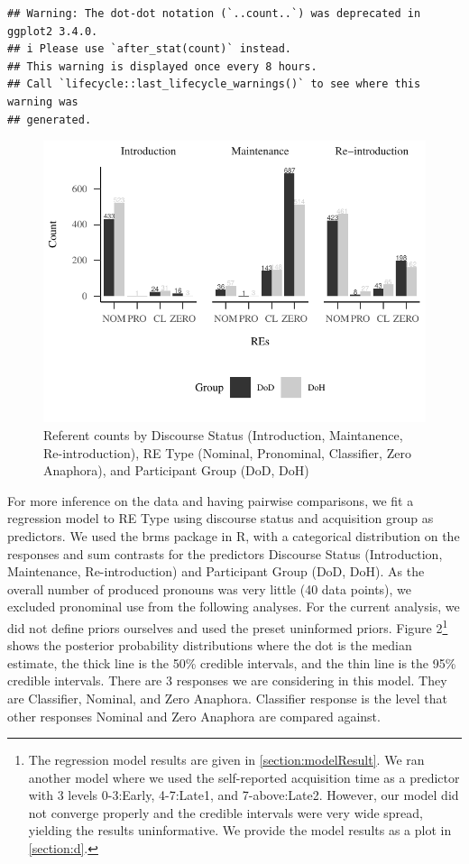 \documentclass[review]{elsarticle} %
\begin{document}
\begin{verbatim}
## Warning: The dot-dot notation (`..count..`) was deprecated in ggplot2 3.4.0.
## i Please use `after_stat(count)` instead.
## This warning is displayed once every 8 hours.
## Call `lifecycle::last_lifecycle_warnings()` to see where this warning was
## generated.
\end{verbatim}

\begin{figure}
\centering
\includegraphics{revised_manuscript_files/figure-latex/fig-count-plot-1.pdf}
\caption{Referent counts by Discourse Status (Introduction, Maintanence,
Re-introduction), RE Type (Nominal, Pronominal, Classifier, Zero
Anaphora), and Participant Group (DoD, DoH)}
\end{figure}

For more inference on the data and having pairwise comparisons, we fit a
regression model to RE Type using discourse status and acquisition group
as predictors. We used the brms package \citep{burkner2018} in R, with a
categorical distribution on the responses and sum contrasts for the
predictors Discourse Status (Introduction, Maintenance, Re-introduction)
and Participant Group (DoD, DoH). As the overall number of produced
pronouns was very little (40 data points), we excluded pronominal use
from the following analyses. For the current analysis, we did not define
priors ourselves and used the preset uninformed priors. Figure
2\footnote{The regression model results are given in
  \ref{section:modelResult}. We ran another model where we used the
  self-reported acquisition time as a predictor with 3 levels 0-3:Early,
  4-7:Late1, and 7-above:Late2. However, our model did not converge
  properly and the credible intervals were very wide spread, yielding
  the results uninformative. We provide the model results as a plot in
  \ref{section:d}.} shows the posterior probability distributions where
the dot is the median estimate, the thick line is the 50\% credible
intervals, and the thin line is the 95\% credible intervals. There are 3
responses we are considering in this model. They are Classifier,
Nominal, and Zero Anaphora. Classifier response is the level that other
responses Nominal and Zero Anaphora are compared against.
\end{document}
